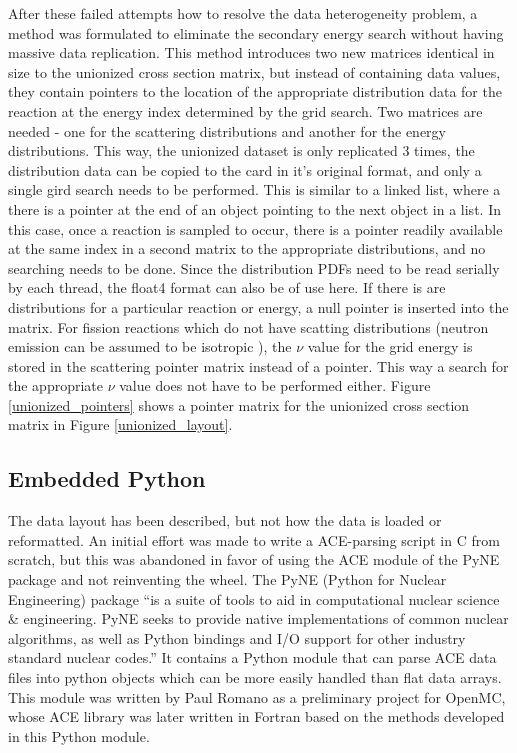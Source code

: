 After these failed attempts how to resolve the data heterogeneity problem, a method was formulated to eliminate the secondary energy search without having massive data replication.  This method introduces two new matrices identical in size to the unionized cross section matrix, but instead of containing data values, they contain pointers to the location of the appropriate distribution data for the reaction at the energy index determined by the grid search.  Two matrices are needed - one for the scattering distributions and another for the energy distributions.  This way, the unionized dataset is only replicated 3 times, the distribution data can be copied to the card in it's original format, and only a single gird search needs to be performed.  This is similar to a linked list, where a there is a pointer at the end of an object pointing to the next object in a list.  In this case, once a reaction is sampled to occur, there is a pointer readily available at the same index in a second matrix to the appropriate distributions, and no searching needs to be done.  Since the distribution PDFs need to be read serially by each thread, the float4 format can also be of use here.  If there is are distributions for a particular reaction or energy, a null pointer is inserted into the matrix.  For fission reactions which do not have scatting distributions (neutron emission can be assumed to be isotropic \cite{openmc}), the $\nu$ value for the grid energy is stored in the scattering pointer matrix instead of a pointer.  This way a search for the appropriate $\nu$ value does not have to be performed either.  Figure \ref{unionized_pointers} shows a pointer matrix for the unionized cross section matrix in Figure \ref{unionized_layout}.

\subsection{Embedded Python}

The data layout has been described, but not how the data is loaded or reformatted.  An initial effort was made to write a ACE-parsing script in C from scratch, but this was abandoned in favor of using the ACE module of the PyNE package and not reinventing the wheel.  The PyNE (Python for Nuclear Engineering) package ``is a suite of tools to aid in computational nuclear science \& engineering. PyNE seeks to provide native implementations of common nuclear algorithms, as well as Python bindings and I/O support for other industry standard nuclear codes.''  It contains a Python module that can parse ACE data files into python objects which can be more easily handled than flat data arrays.  This module was written by Paul Romano as a preliminary project for OpenMC, whose ACE library was later written in Fortran based on the methods developed in this Python module.  

